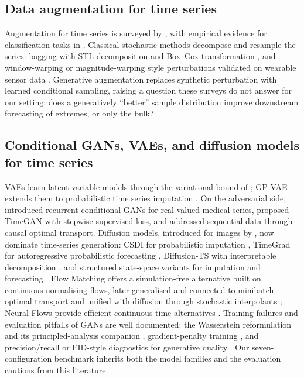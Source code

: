 \subsection{Data augmentation for time series}
Augmentation for time series is surveyed by \citet{wen2021time}, with
empirical evidence for classification tasks in \citet{iwana2021empirical}.
Classical stochastic methods decompose and resample the series: bagging with
STL decomposition and Box--Cox transformation \citep{bergmeir2016bagging}, and
window-warping or magnitude-warping style perturbations validated on wearable
sensor data \citep{um2017data}. Generative augmentation replaces synthetic
perturbation with learned conditional sampling, raising a question these
surveys do not answer for our setting: does a generatively ``better'' sample
distribution improve downstream forecasting of extremes, or only the bulk?

\subsection{Conditional GANs, VAEs, and diffusion models for time series}
VAEs learn latent variable models through the variational bound of
\citet{kingma2014autoencoding}; GP-VAE extends them to probabilistic time
series imputation \citep{fortuin2020gpvae}. On the adversarial side,
\citet{esteban2017realvalued} introduced recurrent conditional GANs for
real-valued medical series, \citet{yoon2019timegan} proposed TimeGAN with
stepwise supervised loss, and \citet{xu2020cotgan} addressed sequential data
through causal optimal transport. Diffusion models, introduced for images by
\citet{ho2020denoising}, now dominate time-series generation:
CSDI for probabilistic imputation \citep{tashiro2021csdi}, TimeGrad for
autoregressive probabilistic forecasting \citep{rasul2021timegrad},
Diffusion-TS with interpretable decomposition \citep{yuan2024diffusionts},
and structured state-space variants for imputation and forecasting
\citep{alcaraz2023diffusion}. Flow Matching \citep{lipman2023flow} offers a
simulation-free alternative built on continuous normalising flows, later
generalised and connected to minibatch optimal transport
\citep{tong2024improving} and unified with diffusion through stochastic
interpolants \citep{albergo2025stochastic}; Neural Flows provide efficient
continuous-time alternatives \citep{bilos2021neural}. Training failures and
evaluation pitfalls of GANs are well documented: the Wasserstein reformulation
\citep{arjovsky2017wasserstein} and its principled-analysis companion
\citep{arjovsky2017towards}, gradient-penalty training
\citep{gulrajani2017wgangp}, and precision/recall or FID-style diagnostics for
generative quality \citep{sajjadi2018assessing,heusel2017gans}. Our
seven-configuration benchmark inherits both the model families and the evaluation
cautions from this literature.

